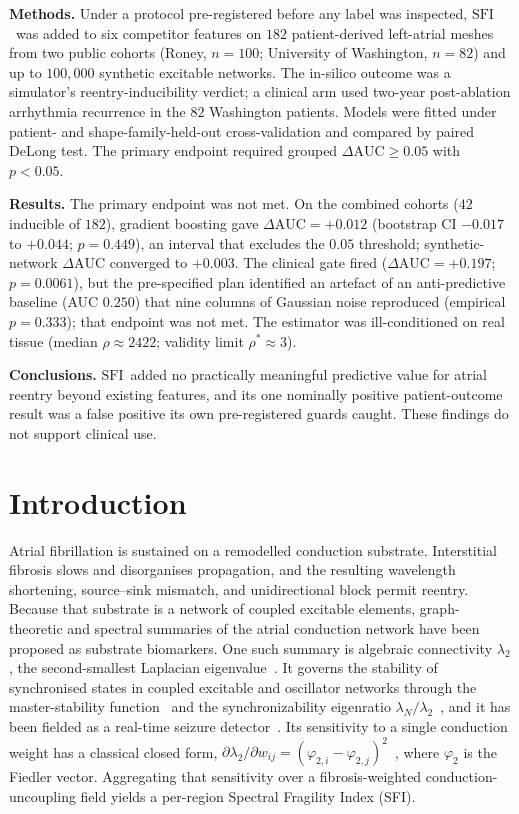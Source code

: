 \documentclass[11pt]{article}
\newcommand{\lam}{\lambda}
\newcommand{\phii}{\varphi}
\newcommand{\rhoval}{\rho}
\newcommand{\SFI}{\ensuremath{\mathrm{SFI}}}
\newcommand{\dAUC}{\ensuremath{\Delta\mathrm{AUC}}}
\begin{document}
\medskip
\noindent\textbf{Methods.} Under a protocol pre-registered before any label was
inspected, \SFI\ was added to six competitor features on $182$ patient-derived
left-atrial meshes from two public cohorts (Roney, $n=100$; University of
Washington, $n=82$) and up to $100{,}000$ synthetic excitable networks. The
in-silico outcome was a simulator's reentry-inducibility verdict; a clinical arm
used two-year post-ablation arrhythmia recurrence in the $82$ Washington
patients. Models were fitted under patient- and shape-family-held-out
cross-validation and compared by paired DeLong test. The primary endpoint
required grouped $\dAUC\geq0.05$ with $p<0.05$.

\medskip
\noindent\textbf{Results.} The primary endpoint was not met. On the combined
cohorts ($42$ inducible of $182$), gradient boosting gave $\dAUC=+0.012$
(bootstrap CI $-0.017$ to $+0.044$; $p=0.449$), an interval that excludes the
$0.05$ threshold; synthetic-network $\dAUC$ converged to $+0.003$. The clinical
gate fired ($\dAUC=+0.197$; $p=0.0061$), but the pre-specified plan identified
an artefact of an anti-predictive baseline (AUC $0.250$) that nine columns of
Gaussian noise reproduced (empirical $p=0.333$); that endpoint was not met. The
estimator was ill-conditioned on real tissue (median $\rhoval\approx2422$;
validity limit $\rhoval^{\ast}\approx3$).

\medskip
\noindent\textbf{Conclusions.} \SFI\ added no practically meaningful predictive
value for atrial reentry beyond existing features, and its one nominally
positive patient-outcome result was a false positive its own pre-registered
guards caught. These findings do not support clinical use.

\newpage

\section{Introduction}
Atrial fibrillation is sustained on a remodelled conduction substrate.
Interstitial fibrosis slows and disorganises propagation, and the resulting
wavelength shortening, source--sink mismatch, and unidirectional block permit
reentry. Because that substrate is a network of coupled excitable elements,
graph-theoretic and spectral summaries of the atrial conduction network have
been proposed as substrate biomarkers. One such summary is algebraic
connectivity $\lam_2$, the second-smallest Laplacian
eigenvalue~\cite{fiedler1973}. It governs the stability of synchronised states in
coupled excitable and oscillator networks through the master-stability
function~\cite{pecora1998} and the synchronizability
eigenratio $\lam_N/\lam_2$~\cite{barahona2002}, and it has been fielded as a
real-time seizure detector~\cite{bomela2020}. Its sensitivity to a single
conduction weight has a classical closed form,
$\partial\lam_2/\partial w_{ij}=(\phii_{2,i}-\phii_{2,j})^2$~\cite{ghosh2006},
where $\phii_2$ is the Fiedler vector. Aggregating that
sensitivity over a fibrosis-weighted conduction-uncoupling field yields a
per-region Spectral Fragility Index (SFI).
\end{document}
